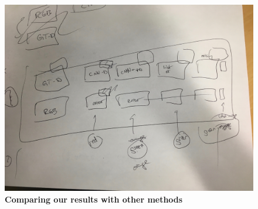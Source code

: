 \begin{figure}
  \includegraphics[width=\textwidth/2]{sections/figures/comparison.jpeg}
  \caption{\textbf{Comparing our results with other methods}}
\end{figure}
